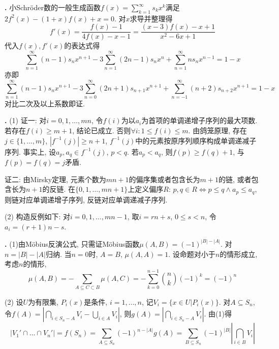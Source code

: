 \par \textbf{\thesolenum .} \cite{IC} 小Schröder数的一般生成函数$f(x)=\sum_{k=1}^\infty s_kx^k$满足$2f^2(x) - (1+x)f(x) + x = 0$. 对$x$求导并整理得
\begin{equation*}
    f'(x) = \frac{f(x)-1}{4f(x)-x-1} = \frac{(x-3)f(x)-x+1}{x^2-6x+1}
\end{equation*}
代入$f(x),f'(x)$的表达式得
\begin{equation*}
    \sum_{n=1}^\infty (n-1)s_n x^{n+1} -3 \sum_{n=1}^\infty (2n-1) s_n x^n + \sum_{n=1}^\infty ns_n x^{n-1} = 1-x 
\end{equation*}
亦即
\begin{equation*}
    \sum_{n=1}^\infty (n-1)s_n x^{n+1} -3 \sum_{n=0}^\infty (2n+1) s_{n+1} x^{n+1} + \sum_{n=-1}^\infty (n+2)s_{n+2} x^{n+1} = 1-x 
\end{equation*}
对比二次及以上系数即证. 

\par \textbf{\thesolenum .} (1) 证一: 对$i=0,1,\dots, mn$, 令$f(i)$为以$a_i$为首项的单调递增子序列的最大项数. 若存在$f(i)\ge m+1$, 结论已成立. 否则$\forall i: 1\le f(i)\le m$. 由鸽笼原理, 存在$j\in \{1,\dots,m\}$, $|f^{-1}(j)|\ge n+1$, $f^{-1}(j)$中的元素按原序列顺序构成单调递减子序列. 事实上, 设$a_p,a_q\in f^{-1}(j)$, $p<q$. 若$a_p<a_q$, 则$f(p)\ge f(q)+1$, 与$f(p)=f(q)=j$矛盾. 
\par 证二: 由Mirsky定理, 元素个数为$mn+1$的偏序集或者包含长为$m+1$的链, 或者包含长为$n+1$的反链. 在$\{0,1,\dots,mn+1\}$上定义偏序$R$: $p,q\in R\iff p\le q \land a_p\le a_q$, 则链对应单调递增子序列, 反链对应单调递减子序列. 
\par (2) 构造反例如下: 对$i=0,1,\dots, mn-1$, 取$i=rn+s$, $0\le s < n$, 令$a_i=(r+1)n-s$. 

\par \textbf{\thesolenum .} \cite{IC} (1)由Möbius反演公式, 只需证Möbius函数$\mu(A,B)=(-1)^{|B|-|A|}$. 对$n=|B|-|A|$归纳. 当$n=0$时, $A=B$, $\mu(A,A)=1$. 设命题对小于$n$的情形成立, 考虑$n$的情形, 
\begin{equation}
    \mu(A,B)=-\sum_{A\subseteq C\subset B} \mu(A,C)=-\sum_{k=0}^{n-1} \binom{n}{k} (-1)^{k}=(-1)^n
\end{equation}
\par (2) 设$U$为有限集, $P_i(x)$是条件, $i=1,\dots,n$, 记$V_i=\{x\in U\vert P_i(x)\}$. 对$A\subseteq S_n$, 令$f(A)=|\bigcap_{i\in S_n-A} V_i - \bigcup_{i\in A} V_i|$, 则$g(A)=|\bigcap_{i\in S_n-A} V_i|$. 由(1)得
\begin{equation*}
    |V_1'\cap \dots \cap V_n'| = f(S_n) = \sum_{A\subseteq S_n} (-1)^{n-|A|} g(A)
    = \sum_{B\subseteq S_n} (-1)^{|B|} \left|\bigcap_{i\in B} V_i\right|
\end{equation*}

